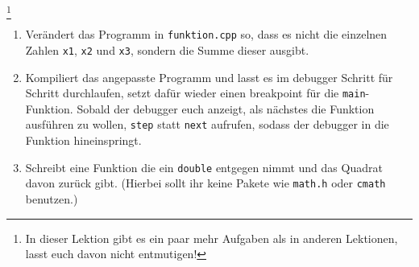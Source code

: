 \begin{praxis}\footnote{In dieser Lektion gibt es ein paar mehr Aufgaben als in anderen Lektionen, lasst euch davon nicht entmutigen!}
	\begin{enumerate}
		\item Verändert das Programm in \texttt{funktion.cpp} so, dass es nicht die einzelnen Zahlen \texttt{x1}, \texttt{x2} und \texttt{x3}, sondern die Summe dieser ausgibt.
		\item Kompiliert das angepasste Programm und lasst es im debugger Schritt für Schritt durchlaufen, setzt dafür wieder einen breakpoint für die \texttt{main}-Funktion.
		      Sobald der debugger euch anzeigt, als nächstes die Funktion ausführen zu wollen, \texttt{step} statt \texttt{next} aufrufen, sodass der debugger in die Funktion hineinspringt.
		\item Schreibt eine Funktion die ein \texttt{double} entgegen nimmt und das Quadrat davon zurück gibt.
		      (Hierbei sollt ihr keine Pakete wie \texttt{math.h} oder \texttt{cmath} benutzen.)
	\end{enumerate}
\end{praxis}

